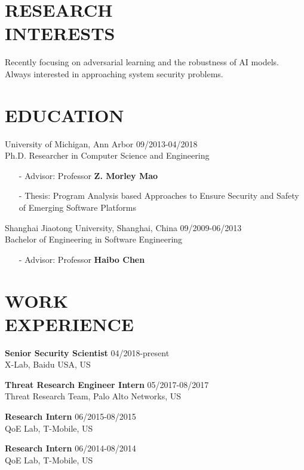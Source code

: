 \documentclass[margin]{res}
\begin{document}
\begin{resume}


\section{RESEARCH \\ INTERESTS}

Recently focusing on adversarial learning and the robustness of AI models. \\
Always interested in approaching system security problems. 

\section{EDUCATION} 
University of Michigan, Ann Arbor \hfill 09/2013-04/2018 \\
Ph.D. Researcher in Computer Science and Engineering
\begin{itemize}
\item[-] Advisor: Professor \textbf{Z. Morley Mao}
\item[-] Thesis: Program Analysis based Approaches to Ensure Security and Safety of Emerging Software Platforms
\end{itemize}

Shanghai Jiaotong University, Shanghai, China \hfill 09/2009-06/2013 \\
Bachelor of Engineering in Software Engineering
\begin{itemize}
\item[-] Advisor: Professor \textbf{Haibo Chen}
\end{itemize}

\section{WORK\\ EXPERIENCE}
\textbf{Senior Security Scientist} \hfill 04/2018-present\\
X-Lab, Baidu USA, US

\textbf{Threat Research Engineer Intern} \hfill 05/2017-08/2017 \\
Threat Research Team, Palo Alto Networks, US

\textbf{Research Intern} \hfill 06/2015-08/2015 \\
QoE Lab, T-Mobile, US

\textbf{Research Intern} \hfill 06/2014-08/2014 \\
QoE Lab, T-Mobile, US


\end{resume}
\end{document}
